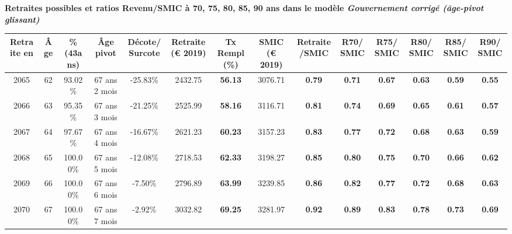  \vspace{0.1cm} 
{\bf \noindent Retraites possibles et ratios Revenu/SMIC à 70, 75, 80, 85, 90 ans dans le modèle \emph{Gouvernement corrigé (âge-pivot glissant)}}  
 
\begin{adjustbox}{max width=\textwidth} 
\begin{tabular}[htb]{|c|c||c|c|c||c|c||c|c||c|c|c|c|c|} 
\hline 
 Retraite en &  Âge &  \%(43ans) &  Âge pivot &  Décote/Surcote &  Retraite (\euro{} 2019) &  Tx Rempl(\%) &  SMIC (\euro{} 2019) &  Retraite/SMIC &  R70/SMIC &  R75/SMIC &  R80/SMIC &  R85/SMIC &  R90/SMIC \\ 
\hline \hline 
 2065 &  62 &  93.02\% &  67 ans 2 mois &  -25.83\% &  2432.75 &  {\bf 56.13} &  3076.71 &  {\bf {\color{red} 0.79}} &  {\bf {\color{red} 0.71}} &  {\bf {\color{red} 0.67}} &  {\bf {\color{red} 0.63}} &  {\bf {\color{red} 0.59}} &  {\bf {\color{red} 0.55}} \\ 
\hline 
 2066 &  63 &  95.35\% &  67 ans 3 mois &  -21.25\% &  2525.99 &  {\bf 58.16} &  3116.71 &  {\bf {\color{red} 0.81}} &  {\bf {\color{red} 0.74}} &  {\bf {\color{red} 0.69}} &  {\bf {\color{red} 0.65}} &  {\bf {\color{red} 0.61}} &  {\bf {\color{red} 0.57}} \\ 
\hline 
 2067 &  64 &  97.67\% &  67 ans 4 mois &  -16.67\% &  2621.23 &  {\bf 60.23} &  3157.23 &  {\bf {\color{red} 0.83}} &  {\bf {\color{red} 0.77}} &  {\bf {\color{red} 0.72}} &  {\bf {\color{red} 0.68}} &  {\bf {\color{red} 0.63}} &  {\bf {\color{red} 0.59}} \\ 
\hline 
 2068 &  65 &  100.00\% &  67 ans 5 mois &  -12.08\% &  2718.53 &  {\bf 62.33} &  3198.27 &  {\bf {\color{red} 0.85}} &  {\bf {\color{red} 0.80}} &  {\bf {\color{red} 0.75}} &  {\bf {\color{red} 0.70}} &  {\bf {\color{red} 0.66}} &  {\bf {\color{red} 0.62}} \\ 
\hline 
 2069 &  66 &  100.00\% &  67 ans 6 mois &  -7.50\% &  2796.89 &  {\bf 63.99} &  3239.85 &  {\bf {\color{red} 0.86}} &  {\bf {\color{red} 0.82}} &  {\bf {\color{red} 0.77}} &  {\bf {\color{red} 0.72}} &  {\bf {\color{red} 0.68}} &  {\bf {\color{red} 0.63}} \\ 
\hline 
 2070 &  67 &  100.00\% &  67 ans 7 mois &  -2.92\% &  3032.82 &  {\bf 69.25} &  3281.97 &  {\bf {\color{red} 0.92}} &  {\bf {\color{red} 0.89}} &  {\bf {\color{red} 0.83}} &  {\bf {\color{red} 0.78}} &  {\bf {\color{red} 0.73}} &  {\bf {\color{red} 0.69}} \\ 
\hline 
\hline 
\end{tabular} 
\end{adjustbox} 
 
